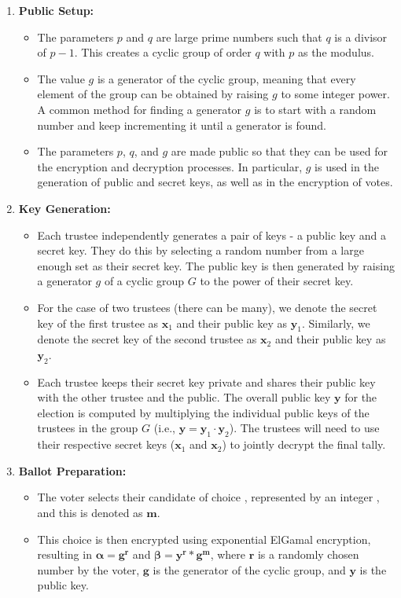 \begin{enumerate}
\item \textbf{Public Setup:}

    \begin{itemize}
        \item The parameters $p$ and $q$ are large prime numbers such that $q$ is a divisor of $p-1$. This creates a cyclic group of order $q$ with $p$ as the modulus.
        \item The value $g$ is a generator of the cyclic group, meaning that every element of the group can be obtained by raising $g$ to some integer power. A common method for finding a generator $g$ is to start with a random number and keep incrementing it until a generator is found.
        \item The parameters $p$, $q$, and $g$ are made public so that they can be used for the encryption and decryption processes. In particular, $g$ is used in the generation of public and secret keys, as well as in the encryption of votes.
    \end{itemize}


    \item \textbf{Key Generation:}
    \begin{itemize}
        \item Each trustee independently generates a pair of keys - a public key and a secret key. They do this by selecting a random number from a large enough set as their secret key. The public key is then generated by raising a generator $g$ of a cyclic group $G$ to the power of their secret key.
        \item For the case of two trustees (there can be many), we denote the secret key of the first trustee as $\textbf{x}_1$ and their public key as $\textbf{y}_1$. Similarly, we denote the secret key of the second trustee as $\textbf{x}_2$ and their public key as $\textbf{y}_2$.
        \item Each trustee keeps their secret key private and shares their public key with the other trustee and the public. The overall public key $\textbf{y}$ for the election is computed by multiplying the individual public keys of the trustees in the group $G$ (i.e., $\textbf{y} = \textbf{y}_1 \cdot \textbf{y}_2$). The trustees will need to use their respective secret keys ($\textbf{x}_1$ and $\textbf{x}_2$) to jointly decrypt the final tally.
    \end{itemize}

    
    \item \textbf{Ballot Preparation:}
    \begin{itemize}
        \item The voter selects their candidate of choice , represented by an integer , and this is denoted as \( \mathbf{m} \).
        \item This choice is then encrypted using exponential ElGamal encryption, resulting in \( \mathbf{\alpha} = \mathbf{g}^{\mathbf{r}} \) and \( \mathbf{\beta} = \mathbf{y}^{\mathbf{r}} * \mathbf{g}^{\mathbf{m}} \), where \( \mathbf{r} \) is a randomly chosen number by the voter, \( \mathbf{g} \) is the generator of the cyclic group, and \( \mathbf{y} \) is the public key.



\end{itemize}
\end{enumerate}
